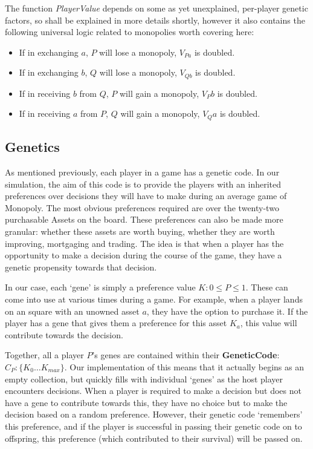 \documentclass[11pt,a4paper,twocolumn]{scrartcl}
\begin{document}
The function \textit{PlayerValue} depends on some as yet unexplained, per-player genetic factors, so shall be explained in more details shortly, however it also contains the following universal logic related to monopolies worth covering here:
\begin{itemize}
\item If in exchanging $a$, $P$ will lose a monopoly, $V_{Pa}$ is doubled.
\item If in exchanging $b$, $Q$ will lose a monopoly, $V_{Qb}$ is doubled.
\item If in receiving $b$ from $Q$, $P$ will gain a monopoly, $V_Pb$ is doubled.
\item If in receiving $a$ from $P$, $Q$ will gain a monopoly, $V_Qa$ is doubled.
\end{itemize}

\subsection{Genetics}

As mentioned previously, each player in a game has a genetic code. In our simulation, the aim of this code is to provide the players with an inherited preferences over decisions they will have to make during an average game of Monopoly. The most obvious preferences required are over the twenty-two purchasable Assets on the board. These preferences can also be made more granular: whether these assets are worth buying, whether they are worth improving, mortgaging and trading. The idea is that when a player has the opportunity to make a decision during the course of the game, they have a genetic propensity towards that decision.

In our case, each `gene' is simply a preference value $K : 0 \leq P \leq 1$. These can come into use at various times during a game. For example, when a player lands on an square with an unowned asset $a$, they have the option to purchase it. If the player has a gene that gives them a preference for this asset $K_{a}$, this value will contribute towards the decision.

Together, all a player $P$'s genes are contained within their \textbf{GeneticCode}: $C_P : \{K_0 \ldots K_{max}\}$. Our implementation of this means that it actually begins as an empty collection, but quickly fills with individual `genes' as the host player encounters decisions. When a player is required to make a decision but does not have a gene to contribute towards this, they have no choice but to make the decision based on a random preference. However, their genetic code `remembers' this preference, and if the player is successful in passing their genetic code on to offspring, this preference (which contributed to their survival) will be passed on.
\end{document}
